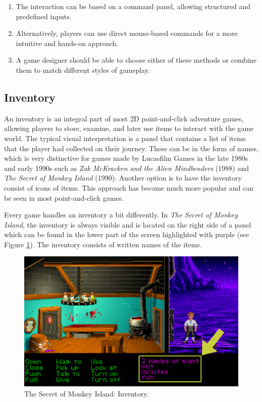 \begin{enumerate}[label=\color{teal}\textbf{R{\arabic*}}]
  \item \label{intro:req:com_pan} The interaction can be based on a command panel, allowing structured and predefined inputs.
  \item \label{intro:req:mouse} Alternatively, players can use direct mouse-based commands for a more intuitive and hands-on approach.
  \item \label{intro:req:mix} A game designer should be able to choose either of these methods or combine them to match different styles of gameplay.
\end{enumerate}

\subsection{Inventory}
\label{sec:Inventory}
An inventory is an integral part of most 2D point-and-click adventure games, allowing players to store, examine, and later use items to interact with the game world. The typical visual interpretation is a panel that contains a list of items that the player had collected on their journey. These can be in the form of names, which is very distinctive for games made by Lucasfilm Games in the late 1980s and early 1990s such as \textit{Zak McKracken and the Alien Mindbenders} (1988) and \textit{The Secret of Monkey Island} (1990). Another option is to have the inventory consist of icons of items. This approach has become much more popular and can be seen in most point-and-click games.

Every game handles an inventory a bit differently. In \textit{The Secret of Monkey Island}, the inventory is always visible and is located on the right side of a panel which can be found in the lower part of the screen highlighted with purple (see Figure \ref{fig:I-TSoMI}). The inventory consists of written names of the items. 

\begin{figure}[H]
\centering
\includegraphics[width=.8\linewidth]{img/I-TSoMI.png}
\caption{The Secret of Monkey Island: Inventory.}
\label{fig:I-TSoMI}
\end{figure}


